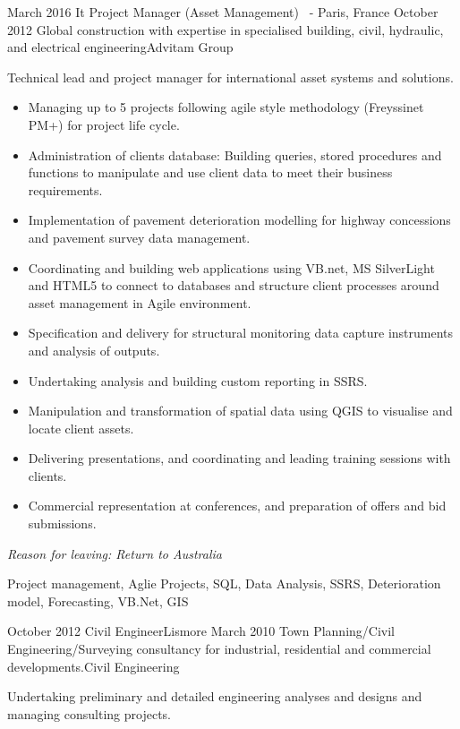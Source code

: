 \begin{experiences}
  \consultantexperience
    {March 2016}     {It Project Manager (Asset Management)}{  \ - }{Paris, France}
    {October 2012}   {Global construction with expertise in specialised building, civil, hydraulic, and electrical engineering}{Advitam Group}
      {Technical lead and project manager for international asset systems and solutions.
                      \begin{itemize}
                     \item Managing up to 5 projects following agile style methodology (Freyssinet PM+) for project life cycle.
		\item Administration of clients database: Building queries, stored procedures and functions to manipulate and use client data to meet their business requirements. 
		\item Implementation of pavement deterioration modelling for highway concessions and pavement survey data management.
		\item Coordinating and building web applications using VB.net, MS SilverLight and HTML5 to connect to databases and structure client processes around asset management in Agile environment.
   		\item Specification and delivery for structural monitoring data capture instruments and analysis of outputs.
		\item Undertaking analysis and building custom reporting in SSRS.
		\item Manipulation and transformation of spatial data using QGIS to visualise and locate client assets.
		\item Delivering presentations, and coordinating and leading training sessions with clients.
		\item Commercial representation at conferences, and preparation of offers and bid submissions.
                      \end{itemize}
                    \textit{Reason for leaving: Return to Australia}
                    }
                    {Project management,  Aglie Projects,  SQL, Data Analysis, SSRS, Deterioration model,  Forecasting, VB.Net, GIS}
  \emptySeparator
  
  \consultantexperience
  {October 2012}       {Civil Engineer}{}{Lismore}
  {March 2010}      {Town Planning/Civil Engineering/Surveying consultancy for industrial, residential and commercial developments.}{Civil Engineering}
                    {Undertaking preliminary and detailed engineering analyses and designs and managing consulting projects.
           \begin{itemize}


\end{itemize}}
\end{experiences}
